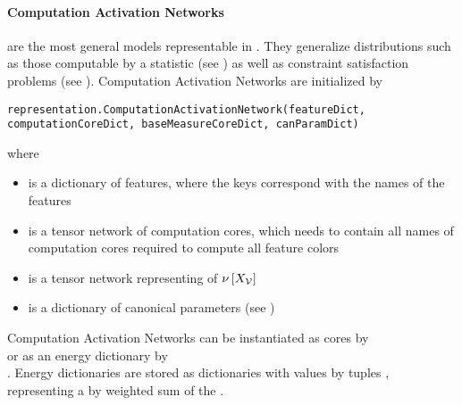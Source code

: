 \paragraph{Computation Activation Networks} are the most general models representable in \tnreason{}.
They generalize distributions such as those computable by a statistic (see ) as well as constraint satisfaction problems (see ).
Computation Activation Networks are initialized by
\begin{lstlisting}
representation.ComputationActivationNetwork(featureDict, computationCoreDict, baseMeasureCoreDict, canParamDict)
\end{lstlisting}
where
\begin{itemize}
    \item {} is a dictionary of features, where the keys correspond with the names of the features
    \item {} is a tensor network of computation cores, which needs to contain all names of computation cores required to compute all feature colors
    \item {} is a tensor network representing of $\nu\left[X_{\mathcal{V}}\right]$
    \item {} is a dictionary of canonical parameters (see )
\end{itemize}
Computation Activation Networks can be instantiated as cores by \\
 or as an energy dictionary by \\
.
Energy dictionaries are stored as dictionaries with values by tuples , representing a by  weighted sum of the .

